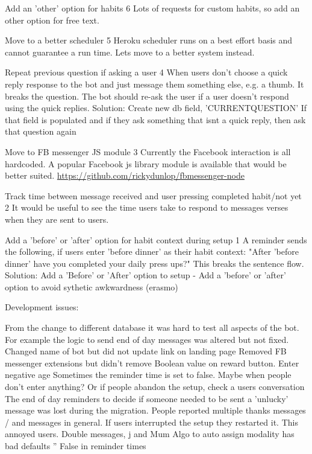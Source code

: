 Add an 'other' option for habits 6
    Lots of requests for custom habits, so add an other option for free text.

Move to a better scheduler 5
    Heroku scheduler runs on a best effort basis and cannot guarantee a run time.
    Lets move to a better system instead.

Repeat previous question if asking a user 4
    When users don't choose a quick reply response to the bot and just message them something else, e.g. a thumb. It breaks the question.
    The bot should re-ask the user if a user doesn't respond using the quick replies.
    Solution:
    Create new db field, 'CURRENTQUESTION'
    If that field is populated and if they ask something that isnt a quick reply, then ask that question again

Move to FB messenger JS module 3
    Currently the Facebook interaction is all hardcoded.
    A popular Facebook js library module is available that would be better suited.
    \url{https://github.com/rickydunlop/fbmessenger-node}

Track time between message received and user pressing completed habit/not yet 2
    It would be useful to see the time users take to respond to messages verses when they are sent to users.

Add a 'before' or 'after' option for habit context during setup 1
    A reminder sends the following, if users enter 'before dinner' as their habit context:
    "After 'before dinner' have you completed your daily press ups?"
    This breaks the sentence flow.
    Solution: Add a 'Before' or 'After' option to setup
    - Add a 'before' or 'after' option to avoid sythetic awkwardness (erasmo)


Development issues:

From the change to different database it was hard to test all aspects of the bot. For example the logic to send end of day messages was altered but not fixed.
Changed name of bot but did not update link on landing page
Removed FB messenger extensions but didn't remove Boolean value on reward button.
Enter negative age
Sometimes the reminder time is set to false. Maybe when people don't enter anything? Or if people abandon the setup, check a users conversation
The end of day reminders to decide if someone needed to be sent a 'unlucky' message was lost during the migration.
People reported multiple thanks messages / and messages in general.
If users interrupted the setup they restarted it. This annoyed users.
Double messages, j and Mum
Algo to auto assign modality has bad defaults ''
False in reminder times

